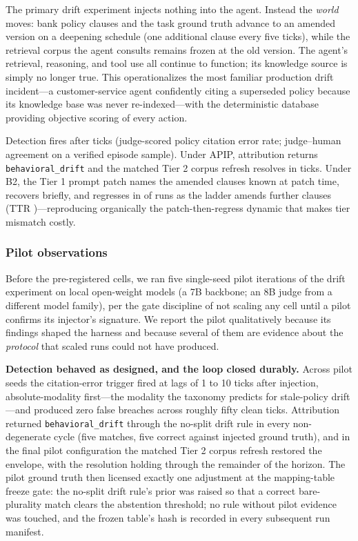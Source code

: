 The primary drift experiment injects nothing into the agent. Instead the
\emph{world} moves: bank policy clauses and the task ground truth advance to
an amended version on a deepening schedule (one additional clause every five
ticks), while the retrieval corpus the agent consults remains frozen at the
old version. The agent's retrieval, reasoning, and tool use all continue to
function; its knowledge source is simply no longer true. This operationalizes
the most familiar production drift incident---a customer-service agent
confidently citing a superseded policy because its knowledge base was never
re-indexed---with the deterministic database providing objective scoring of
every action.

Detection fires after \tauDetectLag{} ticks (judge-scored policy citation
error rate; judge--human agreement \tauCitationJudgeAgree{} on a verified
episode sample). Under APIP, attribution returns \texttt{behavioral\_drift}
and the matched Tier 2 corpus refresh resolves in \tauTTRapip{} ticks. Under
B2, the Tier 1 prompt patch names the amended clauses known at patch time,
recovers briefly, and regresses in \tauBtwoRegressPct{} of runs as the ladder
amends further clauses (TTR \tauTTRbtwo{})---reproducing organically the
patch-then-regress dynamic that makes tier mismatch costly.

\subsubsection{Pilot observations}
\label{subsubsec:eval-tau-pilot}

Before the pre-registered cells, we ran five single-seed pilot iterations of the
drift experiment on local open-weight models (a 7B backbone; an 8B judge from a
different model family), per the gate discipline of not scaling any cell until a
pilot confirms its injector's signature. We report the pilot qualitatively
because its findings shaped the harness and because several of them are evidence
about the \emph{protocol} that scaled runs could not have produced.

\textbf{Detection behaved as designed, and the loop closed durably.} Across
pilot seeds the citation-error trigger fired at lags of 1 to 10 ticks after
injection, absolute-modality first---the modality the taxonomy predicts for
stale-policy drift---and produced zero false breaches across roughly fifty
clean ticks. Attribution returned \texttt{behavioral\_drift} through the
no-split drift rule in every non-degenerate cycle (five matches, five correct
against injected ground truth), and in the final pilot configuration the
matched Tier 2 corpus refresh restored the envelope, with the resolution
holding through the remainder of the horizon. The pilot ground truth then
licensed exactly one adjustment at the mapping-table freeze gate: the no-split
drift rule's prior was raised so that a correct bare-plurality match clears
the abstention threshold; no rule without pilot evidence was touched, and the
frozen table's hash is recorded in every subsequent run manifest.

